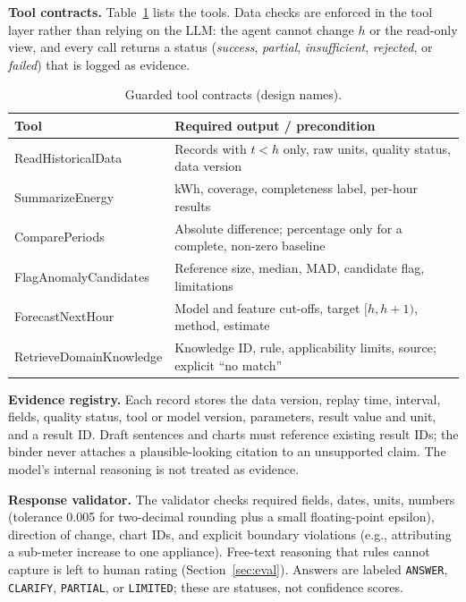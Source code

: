 \documentclass[conference]{IEEEtran}
\begin{document}
\textbf{Tool contracts.} Table~\ref{tab:tools} lists the tools. Data
checks are enforced in the tool layer rather than relying on the LLM:
the agent cannot change $h$ or the read-only view, and every call
returns a status (\emph{success}, \emph{partial}, \emph{insufficient},
\emph{rejected}, or \emph{failed}) that is logged as evidence.

\begin{table}[t]
\centering
\caption{Guarded tool contracts (design names).}
\label{tab:tools}
\footnotesize
\begin{tabular}{@{}>{\raggedright\arraybackslash\ttfamily\scriptsize}p{}p{}@{}}
\toprule
\normalfont\footnotesize Tool & Required output / precondition \\
\midrule
ReadHistoricalData & Records with $t<h$ only, raw units, quality status, data version \\
SummarizeEnergy & kWh, coverage, completeness label, per-hour results \\
ComparePeriods & Absolute difference; percentage only for a complete, non-zero baseline \\
FlagAnomalyCandidates & Reference size, median, MAD, candidate flag, limitations \\
ForecastNextHour & Model and feature cut-offs, target $[h,h{+}1)$, method, estimate \\
RetrieveDomainKnowledge & Knowledge ID, rule, applicability limits, source; explicit ``no match'' \\
\bottomrule
\end{tabular}
\end{table}

\textbf{Evidence registry.} Each record stores the data version, replay
time, interval, fields, quality status, tool or model version,
parameters, result value and unit, and a result ID. Draft sentences and
charts must reference existing result IDs; the binder never attaches a
plausible-looking citation to an unsupported claim. The model's
internal reasoning is not treated as evidence.

\textbf{Response validator.} The validator checks required fields,
dates, units, numbers (tolerance 0.005 for two-decimal rounding plus a
small floating-point epsilon), direction of change, chart IDs, and
explicit boundary violations (e.g., attributing a sub-meter increase to
one appliance). Free-text reasoning that rules cannot capture is left to
human rating (Section~\ref{sec:eval}). Answers are labeled
\texttt{ANSWER}, \texttt{CLARIFY}, \texttt{PARTIAL}, or
\texttt{LIMITED}; these are statuses, not confidence scores.
\end{document}
